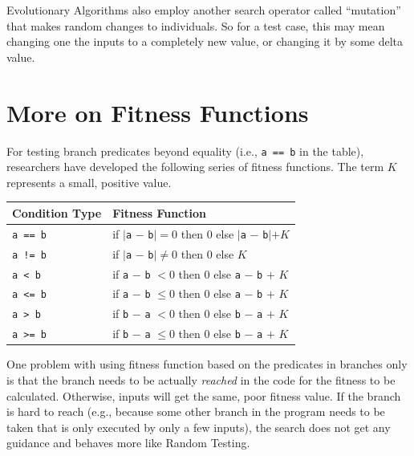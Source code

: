 
Evolutionary Algorithms also employ another search operator called ``mutation''
that makes random changes to individuals. So for a test case, this may mean
changing one the inputs to a completely new value, or changing it by some delta
value. 



\section{More on Fitness Functions}

For testing branch predicates beyond equality (i.e., {\tt a == b} in the table),
researchers have developed the following series of fitness functions. The term
$K$ represents a small, positive value.

\begin{center}
    \begin{tabular}{ll}
        \toprule
        {\bf Condition Type} & {\bf Fitness Function} \\
        \midrule
        {\tt a == b} & if $|${\tt a} $-$ {\tt b}$| = 0$ then $0$ else $|${\tt a} $-$ {\tt b}$| + K$ \\
        {\tt a != b} & if $|${\tt a} $-$ {\tt b}$| \neq 0$ then $0$ else $K$ \\
        {\tt a < b}  & if {\tt a} $-$ {\tt b} $< 0$ then $0$ else {\tt a} $-$ {\tt b} $+$ $K$ \\
        {\tt a <= b} & if {\tt a} $-$ {\tt b} $\leq 0$ then $0$ else {\tt a} $-$ {\tt b} $+$ $K$ \\
        {\tt a > b}  & if {\tt b} $-$ {\tt a} $< 0$ then $0$ else {\tt b} $-$ {\tt a} $+$ $K$ \\
        {\tt a >= b} & if {\tt b} $-$ {\tt a} $\leq 0$ then $0$ else {\tt b} $-$ {\tt a} $+$ $K$ \\
        \bottomrule
    \end{tabular}
\end{center}    
    
One problem with using fitness function based on the predicates in branches only
is that the branch needs to be actually {\it reached} in the code for the
fitness to be calculated. Otherwise, inputs will get the same, poor fitness
value. If the branch is hard to reach (e.g., because some other branch in the
program needs to be taken that is only executed by only a few inputs), the
search does not get any guidance and behaves more like Random Testing.

